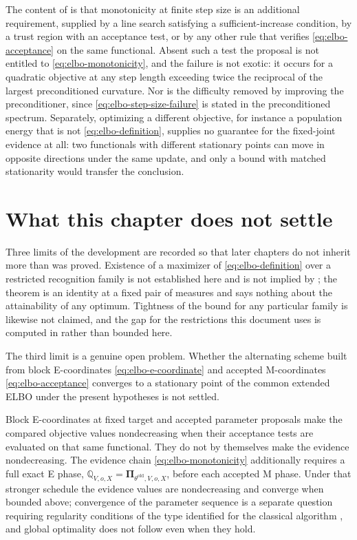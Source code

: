 The content of  is that monotonicity at finite step size is an additional requirement, supplied by a line search satisfying a sufficient-increase condition, by a trust region with an acceptance test, or by any other rule that verifies \eqref{eq:elbo-acceptance} on the same functional. Absent such a test the proposal is not entitled to \eqref{eq:elbo-monotonicity}, and the failure is not exotic: it occurs for a quadratic objective at any step length exceeding twice the reciprocal of the largest preconditioned curvature. Nor is the difficulty removed by improving the preconditioner, since \eqref{eq:elbo-step-size-failure} is stated in the preconditioned spectrum. Separately, optimizing a different objective, for instance a population energy that is not \eqref{eq:elbo-definition}, supplies no guarantee for the fixed-joint evidence at all: two functionals with different stationary points can move in opposite directions under the same update, and only a bound with matched stationarity would transfer the conclusion.

\section{What this chapter does not settle}
\label{sec:elbo-open}

Three limits of the development are recorded so that later chapters do not inherit more than was proved. Existence of a maximizer of \eqref{eq:elbo-definition} over a restricted recognition family is not established here and is not implied by ; the theorem is an identity at a fixed pair of measures and says nothing about the attainability of any optimum. Tightness of the bound for any particular family is likewise not claimed, and the gap for the restrictions this document uses is computed in  rather than bounded here.

The third limit is a genuine open problem.
Whether the alternating scheme built from block E-coordinates \eqref{eq:elbo-e-coordinate} and accepted M-coordinates \eqref{eq:elbo-acceptance} converges to a stationary point of the common extended ELBO under the present hypotheses is not settled. 

Block E-coordinates at fixed target and accepted parameter proposals make the
compared objective values nondecreasing when their acceptance tests are
evaluated on that same functional. They do not by themselves make the evidence
nondecreasing. The evidence chain \eqref{eq:elbo-monotonicity} additionally
requires a full exact E phase,
\(\mathbb Q_{V,o,X}=\boldsymbol\Pi_{\theta^{\mathrm{old}},V,o,X}\),
before each accepted M phase.
Under that stronger schedule the evidence values are nondecreasing and converge
when bounded above; convergence of the parameter sequence is a separate
question requiring regularity conditions of the type identified for the
classical algorithm \citep{Wu1983}, and global optimality does not follow even
when they hold. 

